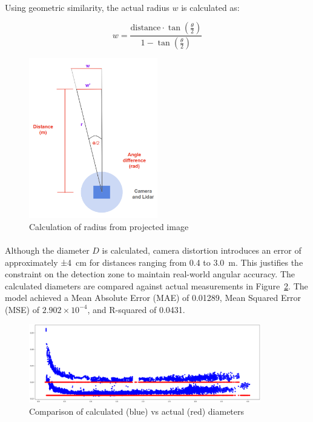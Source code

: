 \paragraph*{}
Using geometric similarity, the actual radius \( w \) is calculated as:

\begin{equation}
w = \frac{ \text{distance} \cdot \tan\left(\frac{\theta}{2}\right) }{ 1 - \tan\left(\frac{\theta}{2}\right) }
\label{eq:radius_projection}
\end{equation}

\begin{figure}[H]
    \centering
    \includegraphics[width=0.5\textwidth]{assets/images/object_detection/fig3.png}
    \caption{Calculation of radius from projected image}
    \label{fig:find_d}
\end{figure}

\paragraph*{}
Although the diameter \( D \) is calculated, camera distortion introduces an error of approximately ±4~cm for distances ranging from 0.4 to 3.0~m. This justifies the constraint on the detection zone to maintain real-world angular accuracy. The calculated diameters are compared against actual measurements in Figure~\ref{fig:D_vs_width}. The model achieved a Mean Absolute Error (MAE) of 0.01289, Mean Squared Error (MSE) of \(2.902 \times 10^{-4}\), and R-squared of 0.0431.

\begin{figure}[H]
    \centering
    \includegraphics[width=0.9\textwidth]{assets/images/object_detection/fig8.png}
    \caption{Comparison of calculated (blue) vs actual (red) diameters}
    \label{fig:D_vs_width}
\end{figure}

